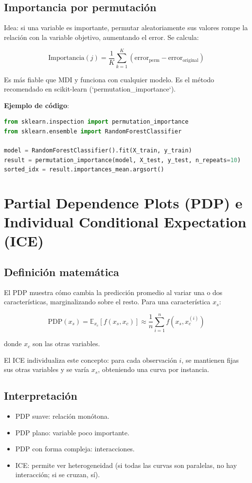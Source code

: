 \documentclass[12pt,a4paper,openany,oneside]{book}
\begin{document}
\subsection{Importancia por permutación}
Idea: si una variable es importante, permutar aleatoriamente sus valores rompe la relación con la variable objetivo, aumentando el error. Se calcula:

\[
\text{Importancia}(j) = \frac{1}{K} \sum_{k=1}^K (\text{error}_{\text{perm}} - \text{error}_{\text{original}})
\]

Es más fiable que MDI y funciona con cualquier modelo. Es el método recomendado en scikit-learn (`permutation_importance`).

\textbf{Ejemplo de código}:
\begin{lstlisting}[language=Python]
from sklearn.inspection import permutation_importance
from sklearn.ensemble import RandomForestClassifier

model = RandomForestClassifier().fit(X_train, y_train)
result = permutation_importance(model, X_test, y_test, n_repeats=10)
sorted_idx = result.importances_mean.argsort()
\end{lstlisting}

\section{Partial Dependence Plots (PDP) e Individual Conditional Expectation (ICE)}

\subsection{Definición matemática}
El PDP muestra cómo cambia la predicción promedio al variar una o dos características, marginalizando sobre el resto. Para una característica \(x_s\):

\[
\text{PDP}(x_s) = \mathbb{E}_{x_c} [f(x_s, x_c)] \approx \frac{1}{n} \sum_{i=1}^n f(x_s, x_c^{(i)})
\]

donde \(x_c\) son las otras variables.

El ICE individualiza este concepto: para cada observación \(i\), se mantienen fijas sus otras variables y se varía \(x_s\), obteniendo una curva por instancia.

\subsection{Interpretación}
\begin{itemize}
    \item PDP suave: relación monótona.
    \item PDP plano: variable poco importante.
    \item PDP con forma compleja: interacciones.
    \item ICE: permite ver heterogeneidad (si todas las curvas son paralelas, no hay interacción; si se cruzan, sí).
\end{itemize}
\end{document}
